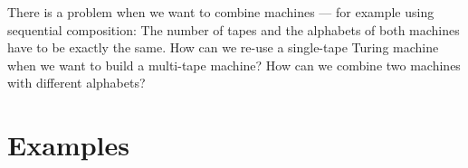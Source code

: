 There is a problem when we want to combine machines --- for example using sequential composition:
The number of tapes and the alphabets of both machines have to be exactly the same.
How can we re-use a single-tape Turing machine when we want to build a multi-tape machine?
How can we combine two machines with different alphabets?






\section{Examples}
\label{sec:combining-examples}




